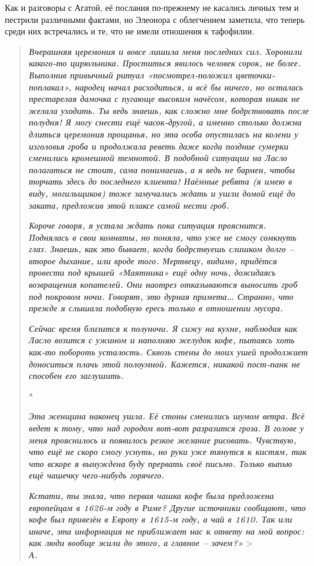 \documentclass[
  a5paperpaper,
  DIV=11,
  numbers=noendperiod]{scrreprt}
\begin{document}
Как и разговоры с Агатой, её послания по-прежнему не касались личных тем
и пестрили различными фактами, но Элеонора с облегчением заметила, что
теперь среди них встречались и те, что не имели отношения к тафофилии.

\begin{quote}
\textbf{\emph{Вчерашняя церемония и вовсе лишила меня последних сил.
Хоронили какого-то цирюльника. Проститься явилось человек сорок, не
более. Выполнив привычный ритуал «посмотрел-положил цветочки-поплакал»,
народец начал расходиться, и всё бы ничего, но осталась престарелая
дамочка с пугающе высоким начёсом, которая никак не желала уходить. Ты
ведь знаешь, как сложно мне бодрствовать после полудня! Я могу снести
ещё часок-другой, а именно столько должна длиться церемония прощанья, но
эта особа опустилась на колени у изголовья гроба и продолжала реветь
даже когда поздние сумерки сменились кромешной темнотой. В подобной
ситуации на Ласло полагаться не стоит, сама понимаешь, а я ведь не
бармен, чтобы торчать здесь до последнего клиента! Наёмные ребята (я
имею в виду, могильщиков) тоже замучались ждать и ушли домой ещё до
заката, предложив этой плаксе самой нести гроб. }}

\textbf{\emph{Короче говоря, я устала ждать пока ситуация прояснится.
Поднялась в свои комнаты, но поняла, что уже не смогу сомкнуть глаз.
Знаешь, как это бывает, когда бодрствуешь слишком долго -- второе
дыхание, или вроде того. Мертвецу, видимо, придётся провести под крышей
«Маятника» ещё одну ночь, дожидаясь возвращения копателей. Они наотрез
отказываются выносить гроб под покровом ночи. Говорят, это дурная
примета\ldots{} Странно, что прежде я слышала подобную ересь только в
отношении мусора.}}

\textbf{\emph{Сейчас время близится к полуночи. Я сижу на кухне,
наблюдая как Ласло возится с ужином и наполняю желудок кофе, пытаясь
хоть как-то побороть усталость. Сквозь стены до моих ушей продолжает
доноситься плачь этой полоумной. Кажется, никакой пост-панк не способен
его заглушить.}}

*

\textbf{\emph{Эта женщина наконец ушла. Её стоны сменились шумом ветра.
Всё ведет к тому, что над городом вот-вот разразится гроза. В голове у
меня прояснилось и появилось резкое желание рисовать. Чувствую, что ещё
не скоро смогу уснуть, но руки уже тянутся к кистям, так что вскоре я
вынуждена буду прервать своё письмо. Только выпью ещё чашечку
чего-нибудь горячего.}}

\textbf{\emph{Кстати, ты знала, что первая чашка кофе была предложена
европейцам в 1626-м году в Риме? Другие источники сообщают, что кофе был
привезён в Европу в 1615-м году, а чай в 1610. Так или иначе, эта
информация не приближает нас к ответу на мой вопрос: как люди вообще
жили до этого, а главное -- зачем?»}} \textgreater{}\\

\textbf{\emph{А.}}
\end{quote}
\end{document}
